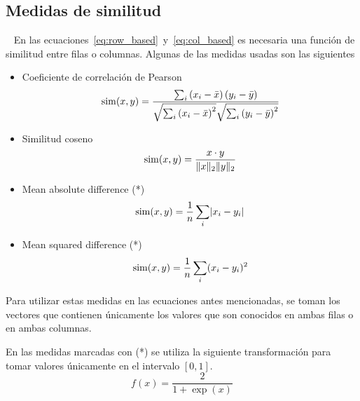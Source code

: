 \subsection{Medidas de similitud}~\label{sec:medidas_similitud}
En las ecuaciones~\ref{eq:row_based}~y~\ref{eq:col_based} es necesaria una función de similitud entre filas o columnas. Algunas de las medidas usadas son las siguientes

\begin{itemize}
    \item Coeficiente de correlación de Pearson
        \begin{equation*}
            \operatorname{sim}(x, y) = \frac{\sum_{i}^{}\left(x_i - \bar x \right) \left(y_i - \bar y \right)}{\sqrt{\sum_{i}^{} \left(x_i - \bar x\right)^2}\sqrt{\sum_{i}^{} \left(y_i - \bar y \right)^2}}
        \end{equation*}
    \item Similitud coseno
        \begin{equation*}
            \operatorname{sim}(x, y) = \frac{x \cdot y}{\lVert x\rVert_2 \lVert y\rVert_2}
        \end{equation*}
    \item Mean absolute difference (*)
        \begin{equation*}
            \operatorname{sim}(x, y) = \frac{1}{n}\sum_{i}^{} \lvert x_i - y_i\rvert
        \end{equation*}
    \item Mean squared difference (*)
        \begin{equation*}
            \operatorname{sim}(x, y) = \frac{1}{n}\sum_{i}^{} (x_i - y_i)^2
        \end{equation*}
\end{itemize}
    
Para utilizar estas medidas en las ecuaciones antes mencionadas, se toman los vectores que contienen únicamente los valores que son conocidos en ambas filas o en ambas columnas.

En las medidas marcadas con (*) se utiliza la siguiente transformación para tomar valores únicamente en el intervalo $[0, 1]$.
\begin{equation*}
    f(x) = \frac{2}{1 + \exp(x)}
\end{equation*}



